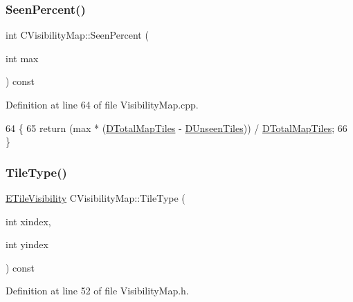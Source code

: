 \subsubsection{\texorpdfstring{Seen\+Percent()}{SeenPercent()}}
{\footnotesize\ttfamily int C\+Visibility\+Map\+::\+Seen\+Percent (\begin{DoxyParamCaption}\item[{int}]{max }\end{DoxyParamCaption}) const}



Definition at line 64 of file Visibility\+Map.\+cpp.


\begin{DoxyCode}
64                                             \{
65     \textcolor{keywordflow}{return} (max * (\hyperlink{classCVisibilityMap_a9bd6e633268535677aeefbd886c29485}{DTotalMapTiles} - \hyperlink{classCVisibilityMap_a117ff39fef73ffd4cc4ba35c35e63171}{DUnseenTiles})) / 
      \hyperlink{classCVisibilityMap_a9bd6e633268535677aeefbd886c29485}{DTotalMapTiles};
66 \}
\end{DoxyCode}
\hypertarget{classCVisibilityMap_a8517fe52114dd469093fd1bd13482733}{}\label{classCVisibilityMap_a8517fe52114dd469093fd1bd13482733} 
\subsubsection{\texorpdfstring{Tile\+Type()}{TileType()}}
{\footnotesize\ttfamily \hyperlink{classCVisibilityMap_a6665f905da08825adbb0eee7bd1f2f30}{E\+Tile\+Visibility} C\+Visibility\+Map\+::\+Tile\+Type (\begin{DoxyParamCaption}\item[{int}]{xindex,  }\item[{int}]{yindex }\end{DoxyParamCaption}) const\hspace{0.3cm}{\ttfamily [inline]}}



Definition at line 52 of file Visibility\+Map.\+h.



